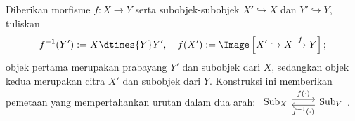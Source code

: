 \begin{definisi}\label{def:subobject-image}
	Diberikan morfisme $f:X\to Y$ serta subobjek-subobjek
	$X'\hookrightarrow X$ dan $Y'\hookrightarrow Y$, tuliskan
	\[ f^{-1}(Y') := X \dtimes{Y} Y', \quad f(X') := \Image\left[ X' \hookrightarrow X \xrightarrow{f} Y \right]; \]
	objek pertama merupakan prabayang $Y'$ dan subobjek dari $X$, sedangkan
	objek kedua merupakan citra $X'$ dan subobjek dari $Y$. Konstruksi ini
	memberikan pemetaan yang mempertahankan urutan dalam dua arah:
	$\begin{tikzcd}
		\mathrm{Sub}_X \arrow[r, yshift=0.3em, "f(\cdot)"] & \mathrm{Sub}_Y \arrow[l, yshift=-0.3em, "f^{-1}(\cdot)"]
	\end{tikzcd}$.
\end{definisi}

